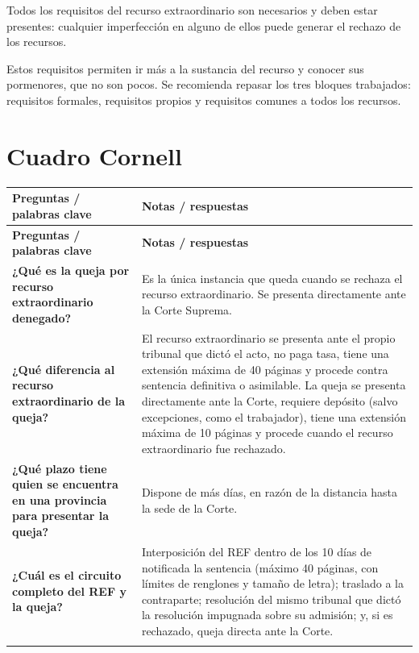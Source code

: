 \documentclass[12pt,oneside]{book}
\begin{document}
\begin{important}
Todos los requisitos del recurso extraordinario son necesarios y deben estar presentes: cualquier imperfección en alguno de ellos puede generar el rechazo de los recursos.
\end{important}

Estos requisitos permiten ir más a la sustancia del recurso y conocer sus pormenores, que no son pocos. Se recomienda repasar los tres bloques trabajados: requisitos formales, requisitos propios y requisitos comunes a todos los recursos.

\clearpage
\section{Cuadro Cornell}

\begin{longtable}{@{}>{\raggedright\arraybackslash}p{}>{\raggedright\arraybackslash}p{}@{}}
\toprule
\textbf{Preguntas / palabras clave} & \textbf{Notas / respuestas} \\
\midrule
\endfirsthead
\toprule
\textbf{Preguntas / palabras clave} & \textbf{Notas / respuestas} \\
\midrule
\endhead
\endfoot
\endlastfoot

\textbf{¿Qué es la queja por recurso extraordinario denegado?} &
Es la única instancia que queda cuando se rechaza el recurso extraordinario. Se presenta directamente ante la Corte Suprema. \\
\addlinespace[0.6em]

\textbf{¿Qué diferencia al recurso extraordinario de la queja?} &
El recurso extraordinario se presenta ante el propio tribunal que dictó el acto, no paga tasa, tiene una extensión máxima de 40 páginas y procede contra sentencia definitiva o asimilable. La queja se presenta directamente ante la Corte, requiere depósito (salvo excepciones, como el trabajador), tiene una extensión máxima de 10 páginas y procede cuando el recurso extraordinario fue rechazado. \\
\addlinespace[0.6em]

\textbf{¿Qué plazo tiene quien se encuentra en una provincia para presentar la queja?} &
Dispone de más días, en razón de la distancia hasta la sede de la Corte. \\
\addlinespace[0.6em]

\textbf{¿Cuál es el circuito completo del REF y la queja?} &
Interposición del REF dentro de los 10 días de notificada la sentencia (máximo 40 páginas, con límites de renglones y tamaño de letra); traslado a la contraparte; resolución del mismo tribunal que dictó la resolución impugnada sobre su admisión; y, si es rechazado, queja directa ante la Corte. \\
\addlinespace[0.6em]


\end{longtable}
\end{document}
